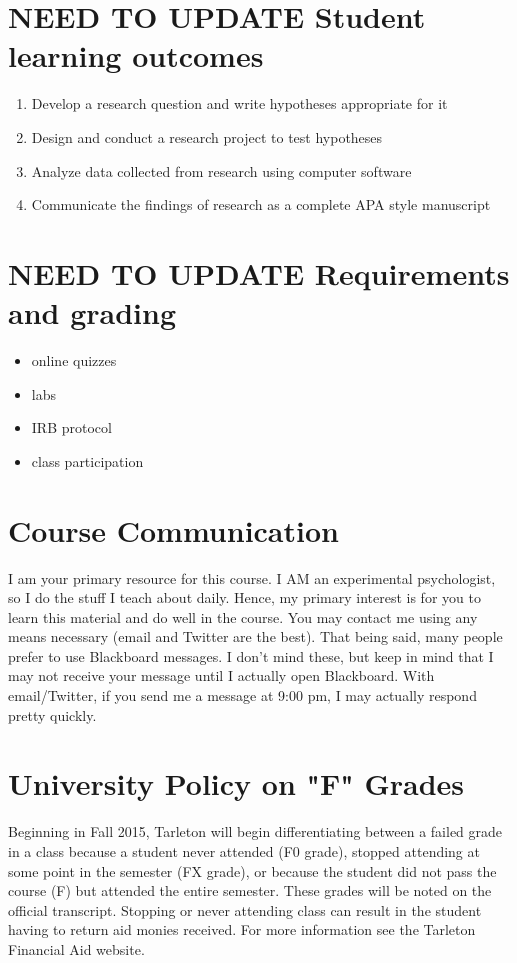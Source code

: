 \documentclass[10pt]{article}
\begin{document}
\section*{NEED TO UPDATE Student learning outcomes}
\label{sec-4}

\begin{enumerate}
\item Develop a research question and write hypotheses appropriate for it
\item Design and conduct a research project to test hypotheses
\item Analyze data collected from research using computer software
\item Communicate the findings of research as a complete APA style manuscript
\end{enumerate}

\section*{NEED TO UPDATE Requirements and grading}
\label{sec-5}
\begin{itemize}
\item online quizzes
\item labs
\item IRB protocol
\item class participation
\end{itemize}

\section*{Course Communication}
\label{sec-6}

I am your primary resource for this course. I AM an experimental psychologist, so I do the stuff I teach about daily. Hence, my primary interest is for you to learn this material and do well in the course. You may contact me using any means necessary (email and Twitter are the best). That being said, many people prefer to use Blackboard messages. I don’t mind these, but keep in mind that I may not receive your message until I actually open Blackboard. With email/Twitter, if you send me a message at 9:00 pm, I may actually respond pretty quickly. 

\section*{University Policy on "F" Grades}
\label{sec-7}

Beginning in Fall 2015, Tarleton will begin differentiating between a failed grade in a class because a student never attended (F0 grade), stopped attending at some point in the semester (FX grade), or because the student did not pass the course (F) but attended the entire semester. These grades will be noted on the official transcript. Stopping or never attending class can result in the student having to return aid monies received.  For more information see the Tarleton Financial Aid website.
\end{document}
